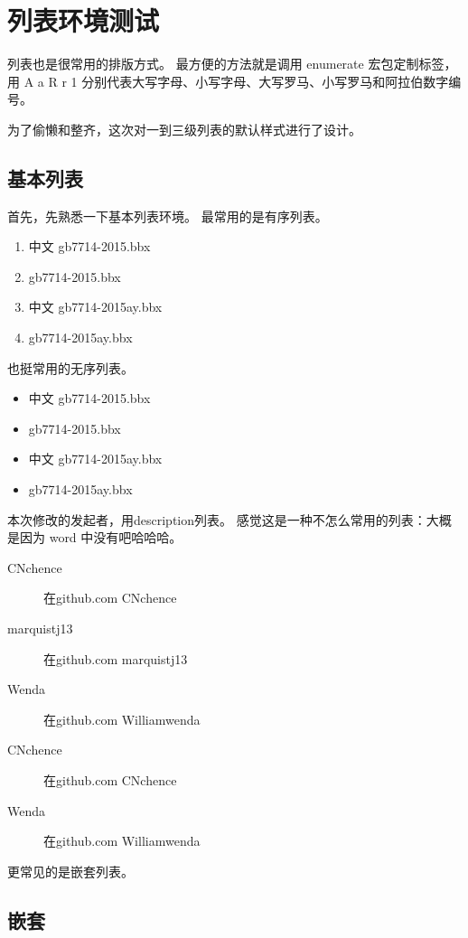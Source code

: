 \documentclass[../Main/thesis]{subfiles}
\begin{document}
\section{列表环境测试} \label{sec:list}

列表也是很常用的排版方式。
最方便的方法就是调用 enumerate 宏包定制标签，用 A a R r 1 分别代表大写字母、小写字母、大写罗马、小写罗马和阿拉伯数字编号。

为了偷懒和整齐，这次对一到三级列表的默认样式进行了设计。

\subsection{基本列表} \label{ssc:basiclist}

首先，先熟悉一下基本列表环境。
最常用的是有序列表。

\begin{enumerate}
  \item 中文 gb7714-2015.bbx
  \item gb7714-2015.bbx
  \item 中文 gb7714-2015ay.bbx
  \item gb7714-2015ay.bbx
\end{enumerate}

也挺常用的无序列表。

\begin{itemize}
  \item 中文 gb7714-2015.bbx
  \item gb7714-2015.bbx
  \item 中文 gb7714-2015ay.bbx
  \item gb7714-2015ay.bbx
\end{itemize}

本次修改的发起者，用description列表。
感觉这是一种不怎么常用的列表：大概是因为 word 中没有吧哈哈哈。

\begin{description}
  \item[CNchence] 在github.com CNchence
  \item[marquistj13] 在github.com marquistj13
  \item[Wenda] 在github.com Williamwenda
  \item[CNchence] 在github.com CNchence
  \item[Wenda] 在github.com Williamwenda
\end{description}

更常见的是嵌套列表。

\subsection{嵌套}
\end{document}
